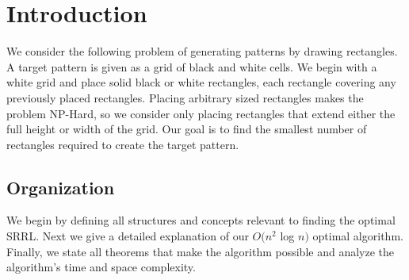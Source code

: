 \section{Introduction}
We consider the following problem of generating patterns by drawing rectangles. 
A target pattern is given as a grid of black and white cells. 
We begin with a white grid and place solid black or white rectangles, each rectangle covering any previously placed rectangles. 
Placing arbitrary sized rectangles makes the problem NP-Hard, so we consider only placing rectangles that extend either the full height or width of the grid. 
Our goal is to find the smallest number of rectangles required to create the target pattern. 
\label{s_intro}





\subsection{Organization}
We begin by defining all structures and concepts relevant to finding the optimal SRRL. 
Next we give a detailed explanation of our $O(n^2$ log $n)$ optimal algorithm. 
Finally, we state all theorems that make the algorithm possible and analyze the algorithm's time and space complexity. 

